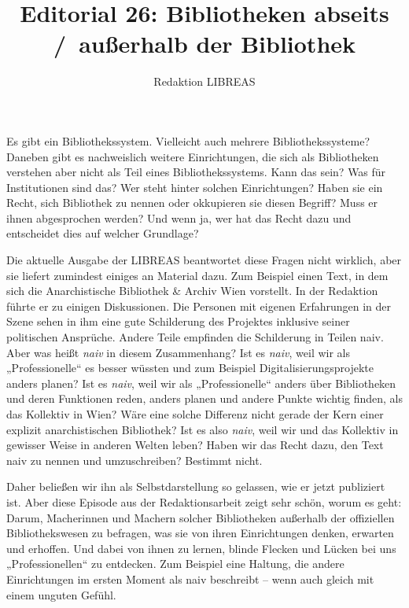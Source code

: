 \documentclass[a4paper,
fontsize=11pt,
oneside,
numbers=noperiodatend,
parskip=half-,
bibliography=totoc,
final
]{scrartcl}
\title{\LARGE{Editorial 26: Bibliotheken abseits /\ außerhalb der Bibliothek}} %
\author{Redaktion LIBREAS} %
\date{}
\begin{document}
\maketitle
\thispagestyle{fancyplain} 


Es gibt ein Bibliothekssystem. Vielleicht auch mehrere
Bibliothekssysteme? Daneben gibt es nachweislich weitere Einrichtungen,
die sich als Bibliotheken verstehen aber nicht als Teil eines
Bibliothekssystems. Kann das sein? Was für Institutionen sind das? Wer
steht hinter solchen Einrichtungen? Haben sie ein Recht, sich Bibliothek
zu nennen oder okkupieren sie diesen Begriff? Muss er ihnen abgesprochen
werden? Und wenn ja, wer hat das Recht dazu und entscheidet dies auf
welcher Grundlage?

Die aktuelle Ausgabe der LIBREAS beantwortet diese Fragen nicht
wirklich, aber sie liefert zumindest einiges an Material dazu. Zum
Beispiel einen Text, in dem sich die Anarchistische Bibliothek \& Archiv
Wien vorstellt. In der Redaktion führte er zu einigen Diskussionen. Die
Personen mit eigenen Erfahrungen in der Szene sehen in ihm eine gute
Schilderung des Projektes inklusive seiner politischen Ansprüche. Andere
Teile empfinden die Schilderung in Teilen naiv. Aber was heißt
\emph{naiv} in diesem Zusammenhang? Ist es \emph{naiv}, weil wir als
„Professionelle`` es besser wüssten und zum Beispiel
Digitalisierungsprojekte anders planen? Ist es \emph{naiv}, weil wir als
„Professionelle`` anders über Bibliotheken und deren Funktionen reden,
anders planen und andere Punkte wichtig finden, als das Kollektiv in
Wien? Wäre eine solche Differenz nicht gerade der Kern einer explizit
anarchistischen Bibliothek? Ist es also \emph{naiv}, weil wir und das
Kollektiv in gewisser Weise in anderen Welten leben? Haben wir das Recht
dazu, den Text naiv zu nennen und umzuschreiben? Bestimmt nicht.

Daher beließen wir ihn als Selbstdarstellung so gelassen, wie er jetzt
publiziert ist. Aber diese Episode aus der Redaktionsarbeit zeigt sehr
schön, worum es geht: Darum, Macherinnen und Machern solcher
Bibliotheken außerhalb der offiziellen Bibliothekswesen zu befragen, was
sie von ihren Einrichtungen denken, erwarten und erhoffen. Und dabei von
ihnen zu lernen, blinde Flecken und Lücken bei uns „Professionellen`` zu
entdecken. Zum Beispiel eine Haltung, die andere Einrichtungen im ersten
Moment als naiv beschreibt -- wenn auch gleich mit einem unguten Gefühl.
\end{document}
